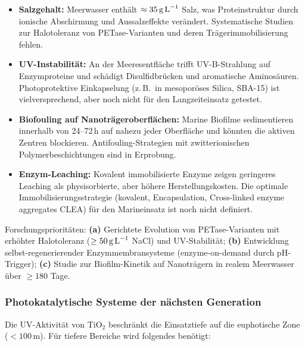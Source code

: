 ﻿\documentclass[12pt,a4paper]{article}
\theoremstyle{definition}
\theoremstyle{remark}
\begin{document}
\begin{itemize}
  \item \textbf{Salzgehalt:} Meerwasser enthält $\approx 35\,\text{g\,L}^{-1}$
        Salz, was Proteinstruktur durch ionische Abschirmung und Aussalzeffekte
        verändert. Systematische Studien zur Halotoleranz von
        PETase-Varianten und deren Trägerimmobilisierung fehlen.
  \item \textbf{UV-Instabilität:} An der Meeresentfläche trifft UV-B-Strahlung
        auf Enzymproteine und schädigt Disulfidbrücken und aromatische Aminosäuren.
        Photoprotektive Einkapselung (z.\,B.\ in mesoporöses Silica, SBA-15)
        ist vielversprechend, aber noch nicht für den Langzeiteinsatz getestet.
  \item \textbf{Biofouling auf Nanoträgeroberflächen:} Marine Biofilme
        sedimentieren innerhalb von 24--72\,h auf nahezu jeder Oberfläche
        und könnten die aktiven Zentren blockieren. Antifouling-Strategien
        mit zwitterionischen Polymerbeschichtungen sind in Erprobung.
  \item \textbf{Enzym-Leaching:} Kovalent immobilisierte Enzyme zeigen
        geringeres Leaching als physisorbierte, aber höhere Herstellungskosten.
        Die optimale Immobilisierungsstrategie (kovalent, Encapsulation,
        Cross-linked enzyme aggregates CLEA) für den Marineinsatz ist
        noch nicht definiert.
\end{itemize}

Forschungsprioritäten: \textbf{(a)} Gerichtete Evolution von PETase-Varianten
mit erhöhter Halotoleranz ($\geq 50\,\text{g\,L}^{-1}$ NaCl) und UV-Stabilität;
\textbf{(b)} Entwicklung selbst-regenerierender Enzymmembransysteme
(enzyme-on-demand durch pH-Trigger); \textbf{(c)} Studie zur Biofilm-Kinetik
auf Nanoträgern in realem Meerwasser über $\geq 180$ Tage.

\subsubsection{Photokatalytische Systeme der nächsten Generation}

Die UV-Aktivität von TiO$_2$ beschränkt die Einsatztiefe auf die euphotische
Zone ($< 100\,\text{m}$). Für tiefere Bereiche wird folgendes benötigt:
\end{document}
